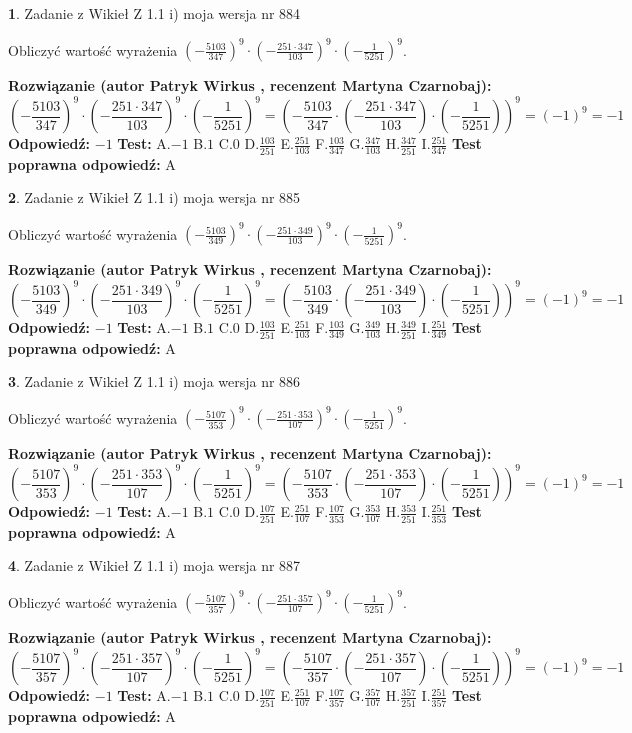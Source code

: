 \documentclass[12pt, a4paper]{article}
\theoremstyle{definition} %
\newtheorem{zad}{}
\newcommand{\zadStart}[1]{\begin{zad}#1\newline}
\newcommand{\zadStop}{\end{zad}}
\newcommand{\rozwStart}[2]{\noindent \textbf{Rozwiązanie (autor #1 , recenzent #2): }\newline}
\newcommand{\rozwStop}{\newline}
\newcommand{\odpStart}{\noindent \textbf{Odpowiedź:}\newline}
\newcommand{\odpStop}{\newline}
\newcommand{\testStart}{\noindent \textbf{Test:}\newline}
\newcommand{\testStop}{\newline}
\newcommand{\kluczStart}{\noindent \textbf{Test poprawna odpowiedź:}\newline}
\newcommand{\kluczStop}{\newline}
\begin{document}
\zadStart{Zadanie z Wikieł Z 1.1 i) moja wersja nr 884}

Obliczyć wartość wyrażenia $(-\frac{5103}{347})^{9} \cdot (-\frac{251 \cdot 347}{103})^{9} \cdot (-\frac{1}{5251})^{9}$.
\zadStop
\rozwStart{Patryk Wirkus}{Martyna Czarnobaj}
$$(-\frac{5103}{347})^{9} \cdot (-\frac{251 \cdot 347}{103})^{9} \cdot (-\frac{1}{5251})^{9} = (-\frac{5103}{347} \cdot (-\frac{251 \cdot 347}{103}) \cdot (-\frac{1}{5251}))^{9} = (-1)^{9} = -1$$
\rozwStop
\odpStart
$-1$
\odpStop
\testStart
A.$-1$ B.$1$ C.$0$ D.$\frac{103}{251}$ E.$\frac{251}{103}$
F.$\frac{103}{347}$ G.$\frac{347}{103}$
H.$\frac{347}{251}$
I.$\frac{251}{347}$
\testStop
\kluczStart
A
\kluczStop



\zadStart{Zadanie z Wikieł Z 1.1 i) moja wersja nr 885}

Obliczyć wartość wyrażenia $(-\frac{5103}{349})^{9} \cdot (-\frac{251 \cdot 349}{103})^{9} \cdot (-\frac{1}{5251})^{9}$.
\zadStop
\rozwStart{Patryk Wirkus}{Martyna Czarnobaj}
$$(-\frac{5103}{349})^{9} \cdot (-\frac{251 \cdot 349}{103})^{9} \cdot (-\frac{1}{5251})^{9} = (-\frac{5103}{349} \cdot (-\frac{251 \cdot 349}{103}) \cdot (-\frac{1}{5251}))^{9} = (-1)^{9} = -1$$
\rozwStop
\odpStart
$-1$
\odpStop
\testStart
A.$-1$ B.$1$ C.$0$ D.$\frac{103}{251}$ E.$\frac{251}{103}$
F.$\frac{103}{349}$ G.$\frac{349}{103}$
H.$\frac{349}{251}$
I.$\frac{251}{349}$
\testStop
\kluczStart
A
\kluczStop



\zadStart{Zadanie z Wikieł Z 1.1 i) moja wersja nr 886}

Obliczyć wartość wyrażenia $(-\frac{5107}{353})^{9} \cdot (-\frac{251 \cdot 353}{107})^{9} \cdot (-\frac{1}{5251})^{9}$.
\zadStop
\rozwStart{Patryk Wirkus}{Martyna Czarnobaj}
$$(-\frac{5107}{353})^{9} \cdot (-\frac{251 \cdot 353}{107})^{9} \cdot (-\frac{1}{5251})^{9} = (-\frac{5107}{353} \cdot (-\frac{251 \cdot 353}{107}) \cdot (-\frac{1}{5251}))^{9} = (-1)^{9} = -1$$
\rozwStop
\odpStart
$-1$
\odpStop
\testStart
A.$-1$ B.$1$ C.$0$ D.$\frac{107}{251}$ E.$\frac{251}{107}$
F.$\frac{107}{353}$ G.$\frac{353}{107}$
H.$\frac{353}{251}$
I.$\frac{251}{353}$
\testStop
\kluczStart
A
\kluczStop



\zadStart{Zadanie z Wikieł Z 1.1 i) moja wersja nr 887}

Obliczyć wartość wyrażenia $(-\frac{5107}{357})^{9} \cdot (-\frac{251 \cdot 357}{107})^{9} \cdot (-\frac{1}{5251})^{9}$.
\zadStop
\rozwStart{Patryk Wirkus}{Martyna Czarnobaj}
$$(-\frac{5107}{357})^{9} \cdot (-\frac{251 \cdot 357}{107})^{9} \cdot (-\frac{1}{5251})^{9} = (-\frac{5107}{357} \cdot (-\frac{251 \cdot 357}{107}) \cdot (-\frac{1}{5251}))^{9} = (-1)^{9} = -1$$
\rozwStop
\odpStart
$-1$
\odpStop
\testStart
A.$-1$ B.$1$ C.$0$ D.$\frac{107}{251}$ E.$\frac{251}{107}$
F.$\frac{107}{357}$ G.$\frac{357}{107}$
H.$\frac{357}{251}$
I.$\frac{251}{357}$
\testStop
\kluczStart
A
\kluczStop
\end{document}
